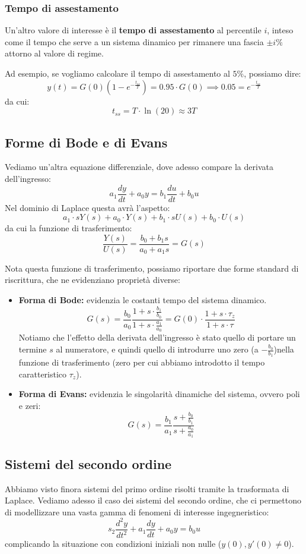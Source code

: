 \documentclass[a4paper,11pt]{article}
\begin{document}
\subsubsection{Tempo di assestamento}
Un'altro valore di interesse è il \textbf{tempo di assestamento} al percentile $i$, inteso come il tempo che serve a un sistema dinamico per rimanere una fascia $\pm i \%$ attorno al valore di regime.

Ad esempio, se vogliamo calcolare il tempo di assestamento al $5\%$, possiamo dire:
$$
y(t) = G(0) \left( 1 - e^{-\frac{t_{ss}}{T}} \right) = 0.95 \cdot G(0) \implies 0.05 = e^{-\frac{t_{ss}}{T}}
$$
da cui:
$$
t_{ss} = T \cdot \ln(20) \approx 3T
$$

\subsection{Forme di Bode e di Evans}
Vediamo un'altra equazione differenziale, dove adesso compare la derivata dell'ingresso:
$$
a_1 \frac{dy}{dt} + a_0 y = b_1 \frac{du}{dt} + b_0 u
$$
Nel dominio di Laplace questa avrà l'aspetto:
$$
a_1 \cdot s Y(s) + a_0 \cdot Y(s) + b_1 \cdot s U(s) + b_0 \cdot U(s)
$$
da cui la funzione di trasferimento:
$$
\frac{Y(s)}{U(s)} = \frac{b_0 + b_1 s}{a_0 + a_1 s} = G(s)
$$

Nota questa funzione di trasferimento, possiamo riportare due forme standard di riscrittura, che ne evidenziano proprietà diverse:
\begin{itemize}
	\item \textbf{Forma di Bode:} evidenzia le costanti tempo del sistema dinamico.
$$
G(s) = \frac{b_0}{a_0} \frac{1 + s \cdot \frac{b_1}{b_0}}{1 + s \cdot \frac{a_1}{a_0}} = G(0) \cdot \frac{1 + s \cdot \tau_z}{1 + s \cdot \tau}
$$
Notiamo che l'effetto della derivata dell'ingresso è stato quello di portare un termine $s$ al numeratore, e quindi quello di introdurre uno zero (a $-\frac{b_0}{b_1}$)nella funzione di trasferimento (zero per cui abbiamo introdotto il tempo caratteristico $\tau_z$).
	\item \textbf{Forma di Evans:} evidenzia le singolarità dinamiche del sistema, ovvero poli e zeri:
		$$
		G(s) = \frac{b_1}{a_1} \frac{s + \frac{b_0}{b_1}}{s + \frac{a_0}{a_1}}
		$$
\end{itemize}

\subsection{Sistemi del secondo ordine}
Abbiamo visto finora sistemi del primo ordine risolti tramite la trasformata di Laplace.
Vediamo adesso il caso dei sistemi del secondo ordine, che ci permettono di modellizzare una vasta gamma di fenomeni di interesse ingegneristico:
$$
s_2 \frac{d^2 y}{dt^2} + a_1 \frac{dy}{dt} + a_0 y = b_0 u
$$
complicando la situazione con condizioni iniziali non nulle ($y(0), y'(0) \neq 0$).
\end{document}
